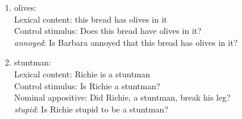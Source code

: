 \documentclass[11pt,fleqn]{article}
\newcommand{\6}{\mbox{$[\hspace*{-.6mm}[$}}
\newcommand{\9}{\mbox{$]\hspace*{-.6mm}]$}}
\begin{document}
\begin{enumerate}
\item olives:  \\
   	Lexical content: this bread has olives in it\\
   	Control stimulus: Does this bread have olives in it?\\
   	{\em annoyed}: Is Barbara annoyed that this bread has olives in it?

\item stuntman:  \\
   	Lexical content: Richie is a stuntman\\
   	Control stimulus: Is Richie a stuntman?\\
   	Nominal appositive: Did Richie, a stuntman, break his leg?\\
   	{\em stupid}: Is Richie stupid to be a stuntman?

\end{enumerate}
\end{document}
